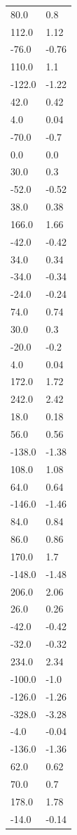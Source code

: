 \begin{longtable}{ll}
80.0 & 0.8 \\
112.0 & 1.12 \\
-76.0 & -0.76 \\
110.0 & 1.1 \\
-122.0 & -1.22 \\
42.0 & 0.42 \\
4.0 & 0.04 \\
-70.0 & -0.7 \\
0.0 & 0.0 \\
30.0 & 0.3 \\
-52.0 & -0.52 \\
38.0 & 0.38 \\
166.0 & 1.66 \\
-42.0 & -0.42 \\
34.0 & 0.34 \\
-34.0 & -0.34 \\
-24.0 & -0.24 \\
74.0 & 0.74 \\
30.0 & 0.3 \\
-20.0 & -0.2 \\
4.0 & 0.04 \\
172.0 & 1.72 \\
242.0 & 2.42 \\
18.0 & 0.18 \\
56.0 & 0.56 \\
-138.0 & -1.38 \\
108.0 & 1.08 \\
64.0 & 0.64 \\
-146.0 & -1.46 \\
84.0 & 0.84 \\
86.0 & 0.86 \\
170.0 & 1.7 \\
-148.0 & -1.48 \\
206.0 & 2.06 \\
26.0 & 0.26 \\
-42.0 & -0.42 \\
-32.0 & -0.32 \\
234.0 & 2.34 \\
-100.0 & -1.0 \\
-126.0 & -1.26 \\
-328.0 & -3.28 \\
-4.0 & -0.04 \\
-136.0 & -1.36 \\
62.0 & 0.62 \\
70.0 & 0.7 \\
178.0 & 1.78 \\
-14.0 & -0.14 \\

\end{longtable}
